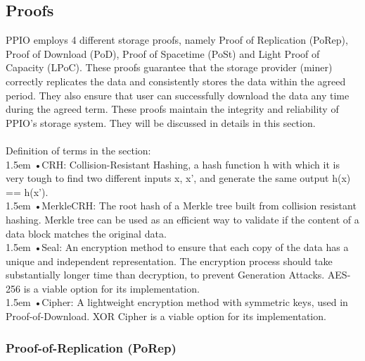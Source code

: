 \documentclass[10pt,a4paper]{article}
\begin{document}
         \subsection{Proofs}%
PPIO employs 4 different storage proofs, namely Proof of Replication (PoRep), Proof of Download (PoD), Proof of Spacetime (PoSt) and Light Proof of Capacity (LPoC). These proofs guarantee that the storage provider (miner) correctly replicates the data and consistently stores the data within the agreed period. They also ensure that user can successfully download the data any time during the agreed term. These proofs maintain the integrity and reliability of PPIO's storage system. They will be discussed in details in this section.
\vspace{-0.5em}
\\ \\Definition of terms in the section:
\vspace{-0.8em}
\\

\hangindent 1.5em
\noindent   
•\quad CRH: Collision-Resistant Hashing, a hash function h with which it is very tough to find two different inputs x, x', and generate the same output h(x) == h(x').
\vspace{-0.8em}
\\

\hangindent 1.5em
\noindent   
•\quad MerkleCRH: The root hash of a Merkle tree built from collision resistant hashing. Merkle tree can be used as an efficient way to validate if the content of a data block matches the original data.
\vspace{-0.8em}
\\

\hangindent 1.5em
\noindent   
•\quad Seal: An encryption method to ensure that each copy of the data has a unique and independent representation. The encryption process should take substantially longer time than decryption, to prevent Generation Attacks. AES-256 is a viable option for its implementation.
\vspace{-0.8em}
\\

\hangindent 1.5em
\noindent   
•\quad Cipher: A lightweight encryption method with symmetric keys, used in Proof-of-Download. XOR Cipher is a viable option for its implementation.  
\vspace{-0.5em}

               \subsubsection{Proof-of-Replication (PoRep)}  %
               
\end{document}
